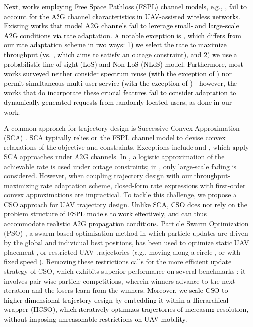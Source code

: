 \documentclass[12pt, draftcls, onecolumn]{IEEEtran}
\theoremstyle{plain}
\theoremstyle{definition}
\theoremstyle{remark}
\newcommand\hlt[1]{\textcolor{black}{#1}}
\begin{document}
\hlt{Next, works employing Free Space Pathloss (FSPL) channel models, e.g., \cite{SCA, PAoI, MEC-CVX, MEC-DDPG}, fail to account for the A2G channel characteristics in UAV-assisted wireless networks. 
Existing works that model A2G channels fail to leverage small- and large-scale A2G conditions via rate adaptation. A notable exception is \cite{Rician}, which differs from our rate adaptation scheme in two ways: 1) we select the rate to maximize throughput (vs. \cite{Rician}, which aims to satisfy an outage constraint), and 2) we use a probabilistic line-of-sight (LoS) and Non-LoS (NLoS) model. Furthermore, most works surveyed neither consider spectrum reuse (with the exception of \cite{CSCA-ADMM}) nor permit simultaneous multi-user service (with the exception of \cite{CSCA-ADMM, DDQN, MEC-DDPG})---however, the works that do incorporate these crucial features \cite{CSCA-ADMM, DDQN, MEC-DDPG} fail to consider adaptation to dynamically generated requests from randomly located users, as done in our work.}

A common approach for trajectory design is Successive Convex Approximation (SCA) \cite{SCA, Rician}. SCA typically relies on the FSPL channel model to devise convex relaxations of the objective and constraints. Exceptions include \cite{Rician} and \cite{CSCA-ADMM}, which apply SCA approaches under A2G channels. In \cite{Rician}, a logistic approximation of the achievable rate is used under outage constraints; in \cite{CSCA-ADMM}, only large-scale fading is considered. However, when coupling trajectory design with our throughput-maximizing rate adaptation scheme, closed-form rate expressions with first-order convex approximations are impractical. To tackle this challenge, we propose a CSO \cite{CSO} approach for UAV trajectory design. \hlt{Unlike SCA, CSO does not rely on the problem structure of FSPL models to work effectively, and can thus accommodate realistic A2G propagation conditions.} Particle Swarm Optimization (PSO) \cite{PSO}, a swarm-based optimization method in which particle updates are driven by the global and individual best positions, has been used to optimize static UAV placement \cite{Efficient3DPlacementPSO, 3DDeploymentPSO}, or restricted UAV trajectories (e.g., moving along a circle \cite{PSOPathStructure}, or with fixed speed \cite{PAoI}). Removing these restrictions calls for the more efficient update strategy of CSO, which exhibits superior performance on several benchmarks \cite{CSO}: it involves pair-wise particle competitions, wherein winners advance to the next iteration and the losers learn from the winners. \hlt{Moreover, we scale CSO to higher-dimensional trajectory design by embedding it within a Hierarchical wrapper (HCSO), which iteratively optimizes trajectories of increasing resolution, without imposing unreasonable restrictions on UAV mobility.}
\end{document}
